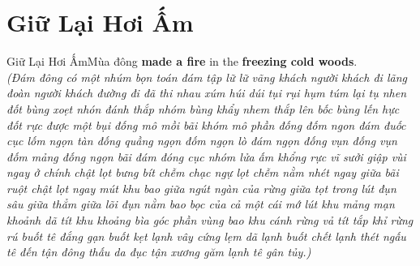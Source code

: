 \ngayDay{}
\section{Giữ Lại Hơi Ấm}
\begin{truyen}{Giữ Lại Hơi Ấm}{Mùa đông}
 \textbf{made a fire} in the \textbf{freezing cold woods}.\\
\textit{(Đám đông có một nhúm bọn toán đám tập lữ lữ vãng khách người khách đi lãng đoàn người khách đường đi đã thi nhau xúm húi dúi tụi rụi hụm túm lại tụ nhen đốt bùng xoẹt nhón đánh thắp nhóm bùng khẩy nhem thắp lên bốc bùng lến hực đốt rực được một bụi đống mô mồi bãi khóm mô phần đống đốm ngon đám đuốc cục lốm ngọn tàn đống quầng ngọn đốm ngọn lò đám ngọn đống vụn đống vụn đốm mảng đống ngọn bãi đám đóng cục nhóm lửa ấm khổng rực vĩ sưởi giập vùi ngay ở chính chật lọt bưng bít chễm chạc ngự lọt chễm nằm nhét ngay giữa bãi ruột chật lọt ngay mút khu bao giữa ngút ngàn của rừng giữa tọt trong lút đụn sâu giữa thẳm giữa lõi đụn nằm bao bọc của cả một cái mớ lút khu mảng mạn khoảnh dã tít khu khoảng bìa góc phần vùng bao khu cánh rừng vả tít tắp khỉ rừng rú buốt tê đắng gạn buốt kẹt lạnh vây cứng lẹm dã lạnh buốt chết lạnh thét ngấu tê đến tận đông thấu da đục tận xương găm lạnh tê gân tủy.)}


\end{truyen}
